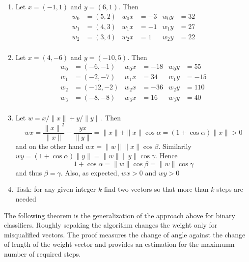 \begin{examples}
    \hfill
    \begin{enumerate}
        \item Let \( x = (-1, 1) \) and \( y = (6, 1) \). Then
              \[
                  \begin{aligned}
                      w_0 & = (5, 2) & w_0x & = -3 & w_0y & = 32 \\
                      w_1 & = (4, 3) & w_1x & = -1 & w_1y & = 27 \\
                      w_2 & = (3, 4) & w_2x & = 1  & w_2y & = 22 \\
                  \end{aligned}
              \]
        \item Let \( x = (4, -6) \) and \( y = (-10, 5) \). Then
              \[
                  \begin{aligned}
                      w_0 & = (-6, -1)  & w_0x & = -18 & w_0y & = 55  \\
                      w_1 & = (-2, -7)  & w_1x & = 34  & w_1y & = -15 \\
                      w_2 & = (-12, -2) & w_2x & = -36 & w_2y & = 110 \\
                      w_3 & = (-8, -8)  & w_3x & = 16  & w_3y & = 40  \\
                  \end{aligned}
              \]
        \item
              Let \( w = x / \|x\| + y/ \|y\| \). Then
              \[
                  wx = \frac{{\|x\|}^2}{\|x\|} + \frac{yx}{\|y\|} = \|x\| + \|x\|\cos\alpha = (1 + \cos\alpha)\|x\| > 0
              \]
              and on the other hand \( wx = \|w\| \|x\| \cos\beta \). Similarily
              \( wy = (1 + \cos\alpha)\|y\| = \|w\| \|y\| \cos\gamma \). Hence
              \[
                  1 + \cos\alpha = \|w\|\cos\beta = \|w\|\cos\gamma
              \]
              and thus \( \beta = \gamma \). Also, as expected, \( wx > 0 \) and \( wy > 0 \)
        \item Task: for any given integer \( k \) find two vectors so that more than \( k \) steps are needed
    \end{enumerate}
\end{examples}
\bigskip


The following theorem is the generalization of the approach above for binary classifiers.
Roughly sepaking the algorithm changes the weight only for misqualified vectors. The proof measures
the change of angle against the change of length of the weight vector and provides an estimation
for the maximumn number of required steps.
\bigskip


